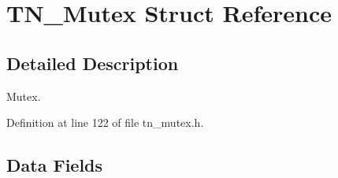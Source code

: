 \hypertarget{structTN__Mutex}{\section{T\+N\+\_\+\+Mutex Struct Reference}
\label{structTN__Mutex}
}


\subsection{Detailed Description}
Mutex. 

Definition at line 122 of file tn\+\_\+mutex.\+h.

\subsection*{Data Fields}
